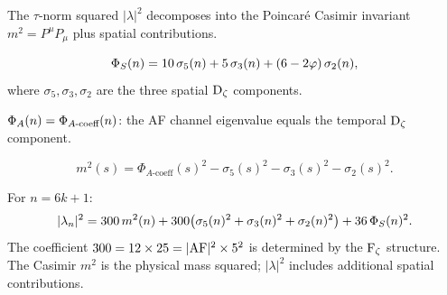 The $\tau$-norm squared $|\lambda|^2$ decomposes into the Poincar\'{e}
Casimir invariant $m^2 = P^\mu P_\mu$ plus spatial contributions.

\begin{theorem}
\label{thm:phiS-decomp}
\[
  \Phi_S(n) = 10\,\sigma_5(n) + 5\,\sigma_3(n) + (6 - 2\varphi)\,\sigma_2(n),
\]
where $\sigma_5, \sigma_3, \sigma_2$ are the three spatial $\operatorname{D_\zeta}$ components.
\end{theorem}

\begin{theorem}[$\phiA = \Dz$ temporal component]
\label{thm:phiA-temporal}
$\Phi_A(n) = \Phi_{A\text{-coeff}}(n)$: the AF channel eigenvalue
equals the temporal $\operatorname{D_\zeta}$ component.
\end{theorem}

\begin{theorem}
\label{thm:casimir-components}
\[
  m^2(s) = \Phi_{A\text{-coeff}}(s)^2 - \sigma_5(s)^2 - \sigma_3(s)^2 - \sigma_2(s)^2.
\]
\end{theorem}

\begin{theorem}
\label{thm:tau-norm-casimir}
For $n = 6k+1$:
\[
  |\lambda_n|^2 = 300\,m^2(n)
    + 300\bigl(\sigma_5(n)^2 + \sigma_3(n)^2 + \sigma_2(n)^2\bigr)
    + 36\,\Phi_S(n)^2.
\]
The coefficient $300 = 12 \times 25 = |\mathrm{AF}|^2 \times 5^2$
is determined by the $\operatorname{F_\zeta}$ structure.
The Casimir $m^2$ is the physical mass squared;
$|\lambda|^2$ includes additional spatial contributions.
\end{theorem}

